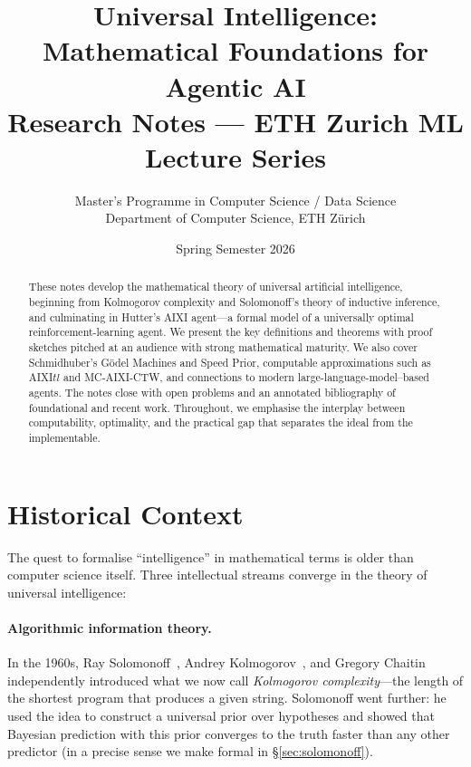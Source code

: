 \documentclass[11pt,a4paper]{article}
\title{\textbf{Universal Intelligence:\\Mathematical Foundations for Agentic AI}\\[6pt]
\large Research Notes --- ETH Zurich ML Lecture Series}
\author{Master's Programme in Computer Science / Data Science\\
Department of Computer Science, ETH Z\"urich}
\date{Spring Semester 2026}
\theoremstyle{definition}
\theoremstyle{remark}
\begin{document}
\maketitle
\tableofcontents
\newpage

\begin{abstract}
These notes develop the mathematical theory of universal artificial intelligence,
beginning from Kolmogorov complexity and Solomonoff's theory of inductive
inference, and culminating in Hutter's AIXI agent---a formal model of a
universally optimal reinforcement-learning agent.  We present the key
definitions and theorems with proof sketches pitched at an audience with strong
mathematical maturity.  We also cover Schmidhuber's G\"odel Machines and Speed
Prior, computable approximations such as AIXI$tl$ and MC-AIXI-CTW, and
connections to modern large-language-model--based agents.  The notes close with
open problems and an annotated bibliography of foundational and recent work.
Throughout, we emphasise the interplay between computability, optimality, and
the practical gap that separates the ideal from the implementable.
\end{abstract}

\section{Historical Context}\label{sec:history}

The quest to formalise ``intelligence'' in mathematical terms is older than
computer science itself.  Three intellectual streams converge in the theory of
universal intelligence:

\paragraph{Algorithmic information theory.}
In the 1960s, Ray Solomonoff~\cite{Solomonoff1964}, Andrey Kolmogorov~\cite{Kolmogorov1965},
and Gregory Chaitin~\cite{Chaitin1966} independently introduced what we now call
\emph{Kolmogorov complexity}---the length of the shortest program that produces
a given string.  Solomonoff went further: he used the idea to construct a
universal prior over hypotheses and showed that Bayesian prediction with
this prior converges to the truth faster than any other predictor
(in a precise sense we make formal in \S\ref{sec:solomonoff}).
\end{document}
